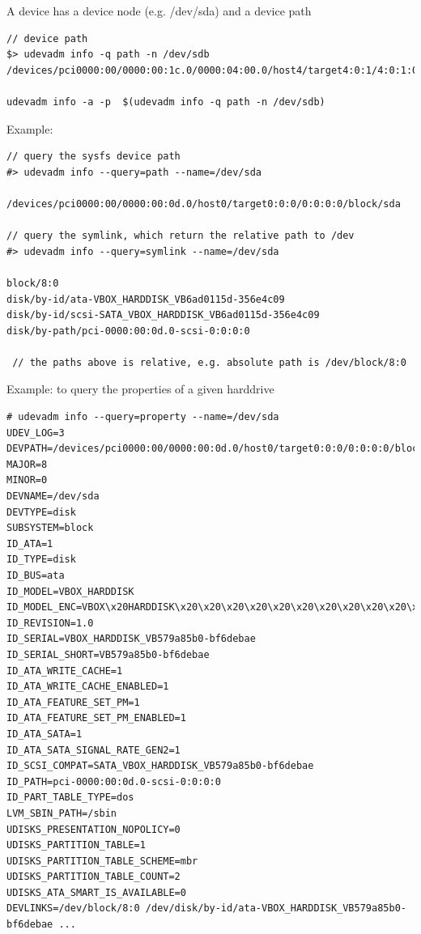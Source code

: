 A device has a device node (e.g. /dev/sda) and a device path
\begin{verbatim}
// device path 
$> udevadm info -q path -n /dev/sdb
/devices/pci0000:00/0000:00:1c.0/0000:04:00.0/host4/target4:0:1/4:0:1:0/block/sdb

udevadm info -a -p  $(udevadm info -q path -n /dev/sdb)
\end{verbatim}

Example:
\begin{verbatim}
// query the sysfs device path
#> udevadm info --query=path --name=/dev/sda

/devices/pci0000:00/0000:00:0d.0/host0/target0:0:0/0:0:0:0/block/sda

// query the symlink, which return the relative path to /dev
#> udevadm info --query=symlink --name=/dev/sda

block/8:0
disk/by-id/ata-VBOX_HARDDISK_VB6ad0115d-356e4c09
disk/by-id/scsi-SATA_VBOX_HARDDISK_VB6ad0115d-356e4c09
disk/by-path/pci-0000:00:0d.0-scsi-0:0:0:0

 // the paths above is relative, e.g. absolute path is /dev/block/8:0
\end{verbatim}

Example: to query the properties of a given harddrive
\begin{verbatim}
# udevadm info --query=property --name=/dev/sda
UDEV_LOG=3
DEVPATH=/devices/pci0000:00/0000:00:0d.0/host0/target0:0:0/0:0:0:0/block/sda
MAJOR=8
MINOR=0
DEVNAME=/dev/sda
DEVTYPE=disk
SUBSYSTEM=block
ID_ATA=1
ID_TYPE=disk
ID_BUS=ata
ID_MODEL=VBOX_HARDDISK
ID_MODEL_ENC=VBOX\x20HARDDISK\x20\x20\x20\x20\x20\x20\x20\x20\x20\x20\x20\x20...
ID_REVISION=1.0
ID_SERIAL=VBOX_HARDDISK_VB579a85b0-bf6debae
ID_SERIAL_SHORT=VB579a85b0-bf6debae
ID_ATA_WRITE_CACHE=1
ID_ATA_WRITE_CACHE_ENABLED=1
ID_ATA_FEATURE_SET_PM=1
ID_ATA_FEATURE_SET_PM_ENABLED=1
ID_ATA_SATA=1
ID_ATA_SATA_SIGNAL_RATE_GEN2=1
ID_SCSI_COMPAT=SATA_VBOX_HARDDISK_VB579a85b0-bf6debae
ID_PATH=pci-0000:00:0d.0-scsi-0:0:0:0
ID_PART_TABLE_TYPE=dos
LVM_SBIN_PATH=/sbin
UDISKS_PRESENTATION_NOPOLICY=0
UDISKS_PARTITION_TABLE=1
UDISKS_PARTITION_TABLE_SCHEME=mbr
UDISKS_PARTITION_TABLE_COUNT=2
UDISKS_ATA_SMART_IS_AVAILABLE=0
DEVLINKS=/dev/block/8:0 /dev/disk/by-id/ata-VBOX_HARDDISK_VB579a85b0-bf6debae ...
\end{verbatim}


